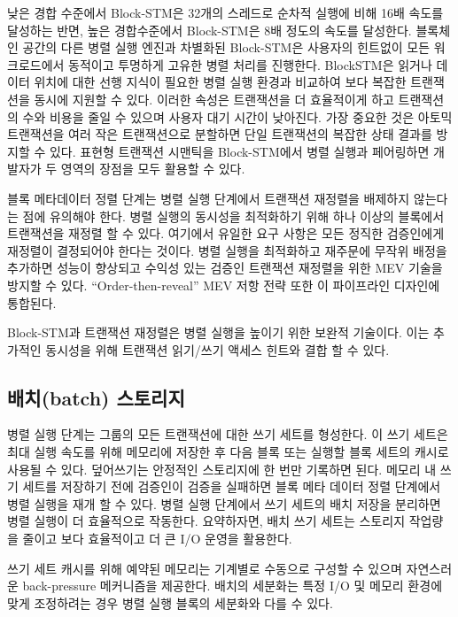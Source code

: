 \documentclass{article}
\begin{document}
낮은 경합 수준에서 Block-STM은 32개의 스레드로 순차적 실행에 비해 16배 속도를 달성하는 반면, 높은 경합수준에서 Block-STM은 8배 정도의 속도를 달성한다. 블록체인 공간의 다른 병렬 실행 엔진과 차별화된 Block-STM은 사용자의 힌트없이 모든 워크로드에서 동적이고 투명하게 고유한 병렬 처리를 진행한다. BlockSTM은 읽거나 데이터 위치에 대한 선행 지식이 필요한 병렬 실행 환경과 비교하여 보다 복잡한 트랜잭션을 동시에 지원할 수 있다. 이러한 속성은 트랜잭션을 더 효율적이게 하고 트랜잭션의 수와 비용을 줄일 수 있으며 사용자 대기 시간이 낮아진다. 가장 중요한 것은 아토믹 트랜잭션을 여러 작은 트랜잭션으로 분할하면 단일 트랜잭션의 복잡한 상태 결과를 방지할 수 있다. 표현형 트랜잭션 시맨틱을 Block-STM에서 병렬 실행과 페어링하면 개발자가 두 영역의 장점을 모두 활용할 수 있다.

블록 메타데이터 정렬 단계는 병렬 실행 단계에서 트랜잭션 재정렬을 배제하지 않는다는 점에 유의해야 한다. 병렬 실행의 동시성을 최적화하기 위해 하나 이상의 블록에서 트랜잭션을 재정렬 할 수 있다. 여기에서 유일한 요구 사항은 모든 정직한 검증인에게 재정렬이 결정되어야 한다는 것이다. 병렬 실행을 최적화하고 재주문에 무작위 배정을 추가하면 성능이 향상되고 수익성 있는 검증인 트랜잭션 재정렬을 위한 MEV 기술을 방지할 수 있다. ``Order-then-reveal'' MEV 저항 전략 또한 이 파이프라인 디자인에 통합된다.

Block-STM과 트랜잭션 재정렬은 병렬 실행을 높이기 위한 보완적 기술이다. 이는 추가적인 동시성을 위해 트랜잭션 읽기/쓰기 액세스 힌트와 결합 할 수 있다.

\subsection{배치(batch) 스토리지}

병렬 실행 단계는 그룹의 모든 트랜잭션에 대한 쓰기 세트를 형성한다. 이 쓰기 세트은 최대 실행 속도를 위해 메모리에 저장한 후 다음 블록 또는 실행할 블록 세트의 캐시로 사용될 수 있다. 덮어쓰기는 안정적인 스토리지에 한 번만 기록하면 된다. 메모리 내 쓰기 세트를 저장하기 전에 검증인이 검증을 실패하면 블록 메타 데이터 정렬 단계에서 병렬 실행을 재개 할 수 있다. 병렬 실행 단계에서 쓰기 세트의 배치 저장을 분리하면 병렬 실행이 더 효율적으로 작동한다. 요약하자면, 배치 쓰기 세트는 스토리지 작업량을 줄이고 보다 효율적이고 더 큰 I/O 운영을 활용한다.

쓰기 세트 캐시를 위해 예약된 메모리는 기계별로 수동으로 구성할 수 있으며 자연스러운 back-pressure 메커니즘을 제공한다. 배치의 세분화는 특정 I/O 및 메모리 환경에 맞게 조정하려는 경우 병렬 실행 블록의 세분화와 다를 수 있다.
\end{document}
